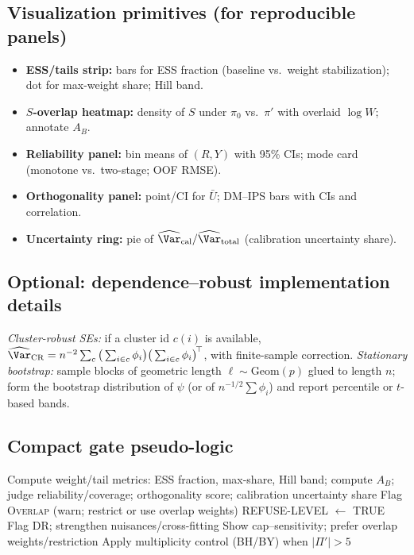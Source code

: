 \subsection{Visualization primitives (for reproducible panels)}
\label{app:diag-viz}
\begin{itemize}[leftmargin=*,itemsep=2pt,topsep=2pt]
\item \textbf{ESS/tails strip:} bars for ESS fraction (baseline vs.\ weight stabilization); dot for max-weight share; Hill band.
\item \textbf{$S$-overlap heatmap:} density of $S$ under $\pi_0$ vs.\ $\pi'$ with overlaid $\log W$; annotate $A_B$.
\item \textbf{Reliability panel:} bin means of $(R,Y)$ with 95\% CIs; mode card (monotone vs.\ two-stage; OOF RMSE).
\item \textbf{Orthogonality panel:} point/CI for $\bar U$; DM--IPS bars with CIs and correlation.
\item \textbf{Uncertainty ring:} pie of $\widehat{\Var}_{\mathrm{cal}}/\widehat{\Var}_{\mathrm{total}}$ (calibration uncertainty share).
\end{itemize}

\subsection{Optional: dependence--robust implementation details}
\label{app:diag-dep}
\emph{Cluster-robust SEs:} if a cluster id $c(i)$ is available,
$\widehat{\Var}_{\mathrm{CR}}=n^{-2}\sum_{c}\big(\sum_{i\in c}\phi_i\big)\big(\sum_{i\in c}\phi_i\big)^{\!\top}$,
with finite-sample correction.\quad
\emph{Stationary bootstrap:} sample blocks of geometric length $\ell\sim\mathrm{Geom}(p)$ glued to length $n$; form the bootstrap distribution of $\hat\psi$ (or of $n^{-1/2}\sum\phi_i$) and report percentile or $t$-based bands.

\subsection{Compact gate pseudo-logic}
\label{app:diag-logic}
\begin{algorithm}[t]
\caption{Gate logic (per policy)}
\label{alg:gates}
\begin{algorithmic}[1]
\STATE Compute weight/tail metrics: ESS fraction, max-share, Hill band; compute $A_B$; judge reliability/coverage; orthogonality score; calibration uncertainty share
 \STATE Flag \textsc{Overlap} (warn; restrict or use overlap weights) \ENDIF
{} \STATE \textsc{REFUSE-LEVEL} $\leftarrow$ TRUE \ENDIF
{} \STATE Flag \textsc{DR}; strengthen nuisances/cross-fitting \ENDIF
{} \STATE Show cap--sensitivity; prefer overlap weights/restriction \ENDIF
\STATE Apply multiplicity control (BH/BY) when $|\Pi'|>5$
\end{algorithmic}
\end{algorithm}
